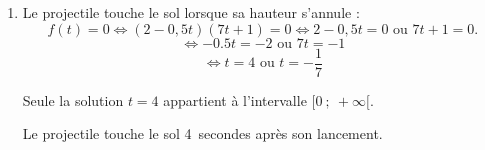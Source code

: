 \documentclass[10pt]{article}
\begin{document}
\begin{enumerate}
\begin{enumerate}
Les solutions sont
		\[t_1 = 1 \qquad\text{et}\qquad t_2  \approx 2,85.\]

La hauteur du projectile est supérieure ou égale à 12~m sur l'intervalle de temps $[1 ; 2,85]$ (en secondes).

		\item Le projectile touche le sol lorsque sa hauteur s'annule :
		\[f(t) = 0 \iff (2-0,5t)(7t+1) = 0 \iff 2-0,5t = 0 \text{ ou }7t+1=0.\]
		\[ \iff -0.5t = -2 \text{ ou } 7t = -1\]
		\[ \iff t = 4 \text{ ou } t = -\frac{1}{7}\]
		
		Seule la solution $t = 4$ appartient à l'intervalle $[0~;~+\infty[$.

		Le projectile touche le sol 4~secondes après son lancement.
	\end{enumerate}
\end{enumerate}
\end{document}
